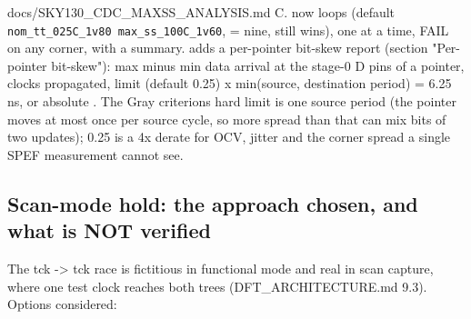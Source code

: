 \begin{relocated}{docs/SKY130_CDC_MAXSS_ANALYSIS.md}
C.  now loops 
(default
\texttt{nom\_\allowbreak{}tt\_\allowbreak{}025C\_\allowbreak{}1v80\ max\_\allowbreak{}ss\_\allowbreak{}100C\_\allowbreak{}1v60},
 = nine,  still wins), one 
at a time, FAIL on any corner, with a summary.
 adds a per-pointer bit-skew report
(section "Per-pointer bit-skew"): max minus min data arrival at the
stage-0 D pins of a pointer, clocks propagated, limit
 (default 0.25) x min(source, destination
period) = 6.25 ns, or absolute . The Gray
criterion\textquotesingle s hard limit is one source period (the pointer
moves at most once per source cycle, so more spread than that can mix
bits of two updates); 0.25 is a 4x derate for OCV, jitter and the corner
spread a single SPEF measurement cannot see.

\subsection{Scan-mode hold: the approach chosen, and what is NOT
verified}\label{tm:pd:sky130-cdc-maxss:6-scan-mode-hold-the-approach-chosen-and-what-is-not-verified}

The tck -\textgreater{} tck race is fictitious in functional mode and
real in scan capture, where one test clock reaches both trees
(DFT\_\allowbreak{}ARCHITECTURE.md 9.3). Options considered:

{\footnotesize\setlength{\tabcolsep}{3pt}

}
\end{relocated}
